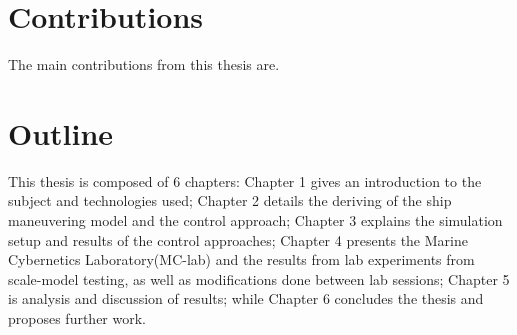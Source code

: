 
\section{Contributions}

The main contributions from this thesis are.


\section{Outline}
This thesis is composed of 6 chapters: Chapter 1 gives an introduction to the subject and technologies used; Chapter 2 details the deriving of the ship maneuvering model and the control approach; Chapter 3 explains the simulation setup and results of the control approaches; Chapter 4 presents the Marine Cybernetics Laboratory(MC-lab) and the results from lab experiments from scale-model testing, as well as modifications done between lab sessions; Chapter 5 is analysis and discussion of results; while Chapter 6 concludes the thesis and proposes further work. 


\cleardoublepage